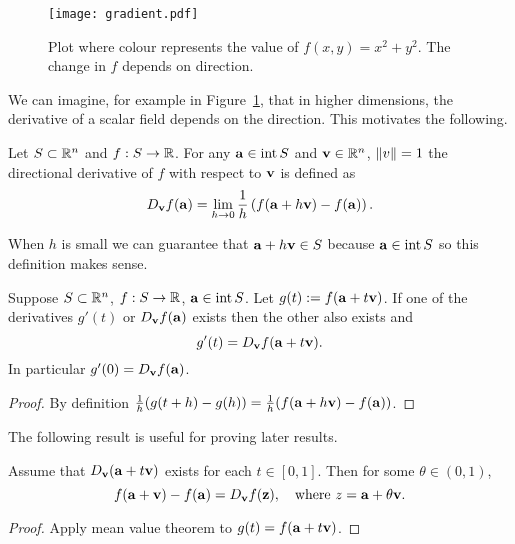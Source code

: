 \begin{figure}
    \begin{center}
        \texttt{[image: gradient.pdf]}
        \caption{Plot where colour represents the value of \(f(x,y)=x^2 + y^2\). The change in \(f\) depends on direction.}
        \label{fig:directional}
    \end{center}
\end{figure}

We can imagine, for example in Figure~\ref{fig:directional}, that in higher dimensions, the derivative of a scalar field depends on the direction.
This motivates the following.

\begin{definition}
    Let \(S\subset \bR^n\) and \(f:S\to \bR\).
    For any \(\aa \in \operatorname{int}S\) and \(\vv \in \bR^n\), \(\norm{v}=1\) the directional derivative of \(f\) with respect to \(\vv\) is defined as
    \[
        D_{\vv}f(\aa) =
        \lim_{h\to 0} \frac{1}{h}\left(  f(\aa+h \vv) - f(\aa)     \right).
    \]
\end{definition}


When \(h\) is small we can guarantee that \(\aa + h \vv \in S\) because \(\aa\in \operatorname{int} S\) so this definition makes sense.


\begin{theorem*}
    Suppose \(S\subset \bR^n\), \(f:S\to \bR\), \(\aa \in \operatorname{int} S\).
    Let \(g(t) := f(\aa + t\vv)\).
    If one of the derivatives \(g'(t)\) or \(D_\vv f(\aa)\) exists then the other also exists and
    \[
        g'(t) = D_{\vv}f(\aa+t \vv).
    \]
    In particular \(g'(0) = D_{\vv}f(\aa)\).
\end{theorem*}

\begin{proof}
    By definition \(\frac{1}{h}(g(t+h)-g(h)) =\frac{1}{h}(f(\aa+h \vv) - f(\aa)) \).
\end{proof}

The following result is useful for proving later results.

\begin{theorem*}
    Assume that \(D_{\vv}(\aa+t\vv)\)  exists for each \(t\in [0,1]\). Then for some \(\theta \in (0,1)\),
    \[
        f(\aa+\vv) - f(\aa) = D_{\vv}f (\zz),
        \quad
        \text{where \(z=\aa + \theta \vv\)}.
    \]
\end{theorem*}

\begin{proof}
    Apply mean value theorem to \(g(t) = f(\aa+t\vv)\).
\end{proof}


